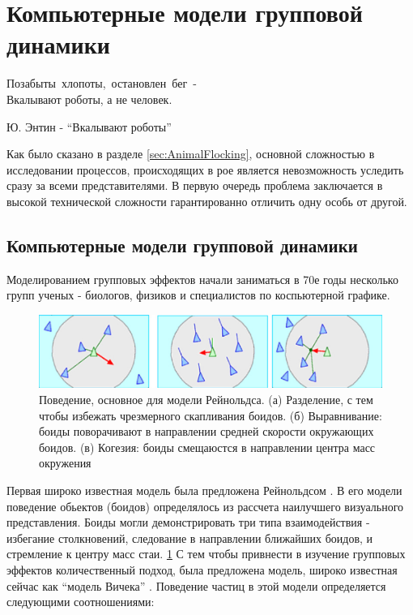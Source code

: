 \section{Компьютерные модели групповой динамики} %
\label{sec:ComputerModelsOfHords}

\epigraph{Позабыты~хлопоты,~остановлен~бег~- \\
Вкалывают роботы, а не человек.}{Ю. Энтин - ``Вкалывают роботы''}
Как было сказано в разделе \ref{sec:AnimalFlocking}, основной сложностью в исследовании процессов, происходящих в рое является невозможность уследить сразу за всеми представителями. В первую очередь проблема заключается в высокой технической сложности гарантированно отличить одну особь от другой.

            \subsection{Компьютерные модели групповой динамики} %
            \label{sub:CompModelsCollMot}
            Моделированием групповых эффектов начали заниматься в 70е годы несколько групп ученых - биологов, физиков и специалистов по коспьютерной графике. 
            \begin{figure}
                \centering
                \includegraphics[width=\textwidth]{Fig31_CollectiveMotion}
                \caption{Поведение, основное для модели Рейнольдса. (а) Разделение, с тем чтобы избежать чрезмерного скапливания боидов. (б) Выравнивание: боиды поворачивают в направлении средней скорости окружающих боидов. (в) Когезия: боиды смещаюстся в направлении центра масс окружения}
                \label{fig:ReynoldsModel}
            \end{figure}
            Первая широко известная модель была предложена Рейнольдсом \cite{reynolds1987}. В его модели поведение обьектов (боидов) определялось из рассчета наилучшего визуального представления. Боиды могли демонстрировать три типа взаимодействия - избегание столкновений, следование в направлении ближайших боидов, и стремление к центру масс стаи. \ref{fig:ReynoldsModel} С тем чтобы привнести в изучение групповых эффектов количественный подход, была предложена модель, широко известная сейчас как ``модель Вичека'' \cite{vicsek1995}. Поведение частиц в этой модели определяется следующими соотношениями:
